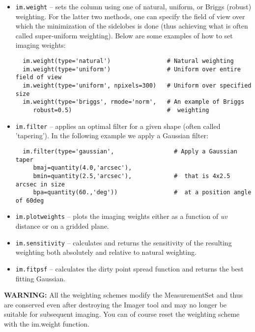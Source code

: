 \begin{itemize}
   \item {\tt im.weight} -- sets the column using one of natural,
          uniform, or Briggs (robust) weighting.  For the latter two
          methods, one can specify the field of view over which the
          minimization of the sidelobes is done (thus achieving what
          is often called super-uniform weighting).  Below are some
          examples of how to set imaging weights:

\small
\begin{verbatim}
  im.weight(type='natural')                # Natural weighting
  im.weight(type='uniform')                # Uniform over entire field of view
  im.weight(type='uniform', npixels=300)   # Uniform over specified size
  im.weight(type='briggs', rmode='norm',   # An example of Briggs
     robust=0.5)                           #  weighting
\end{verbatim}
\normalsize

   \item {\tt im.filter} -- applies an optimal filter for a given
          shape (often called 'tapering'). In the following example we
          apply a Gaussian filter:

\small
\begin{verbatim}
  im.filter(type='gaussian',                 # Apply a Gaussian taper
     bmaj=quantity(4.0,'arcsec'),
     bmin=quantity(2.5,'arcsec'),            #  that is 4x2.5 arcsec in size
     bpa=quantity(60.,'deg'))                #  at a position angle of 60deg
\end{verbatim}
\normalsize

   \item {\tt im.plotweights} -- plots the imaging weights either as a
         function of {\it uv} distance or on a gridded plane. 

   \item {\tt im.sensitivity} -- calculates and returns the
          sensitivity of the resulting weighting both absolutely and relative
          to natural weighting. 

   \item {\tt im.fitpsf} -- calculates the dirty point spread function
         and returns the best fitting Gaussian. 
\end{itemize}

{\bf WARNING:} All the weighting schemes modify the MeasurementSet and
thus are conserved even after destroying the Imager tool and may no
longer be suitable for subsequent imaging.  You can of course reset
the weighting scheme with the im.weight function.

